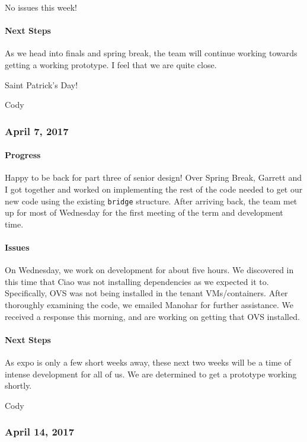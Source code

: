 \documentclass[10pt,onecolumn,journal,draftclsnofoot]{IEEEtran}
\begin{document}
No issues this week!

\paragraph{Next Steps} 

As we head into finals and spring break, the team will continue working
towards getting a working prototype. I feel that we are quite close.

Saint Patrick's Day!

Cody

\subsubsection{April 7, 2017} 

\paragraph{Progress} 

Happy to be back for part three of senior design! Over Spring Break,
Garrett and I got together and worked on implementing the rest of the
code needed to get our new code using the existing \lstinline!bridge!
structure. After arriving back, the team met up for most of Wednesday
for the first meeting of the term and development time.

\paragraph{Issues} 

On Wednesday, we work on development for about five hours. We discovered
in this time that Ciao was not installing dependencies as we expected it
to. Specifically, OVS was not being installed in the tenant
VMs/containers. After thoroughly examining the code, we emailed Manohar
for further assistance. We received a response this morning, and are
working on getting that OVS installed.

\paragraph{Next Steps} 

As expo is only a few short weeks away, these next two weeks will be a
time of intense development for all of us. We are determined to get a
prototype working shortly.

Cody

\subsubsection{April 14, 2017} 
\end{document}

